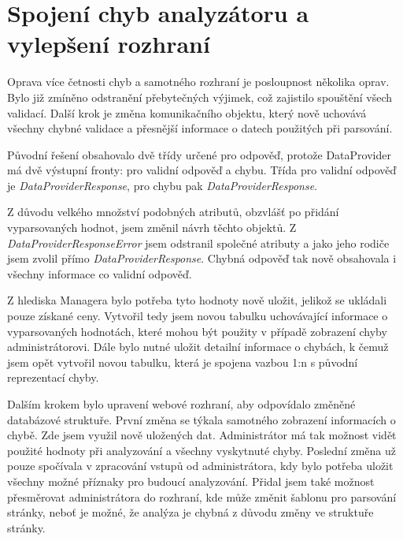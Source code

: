 \documentclass[thesis=B,czech]{FITthesis}[2012/06/26]
\begin{document}
\section{Spojení chyb analyzátoru a vylepšení rozhraní}
Oprava více četnosti chyb a samotného rozhraní je posloupnost několika oprav. 
Bylo již zmíněno odstranění přebytečných výjimek, což zajistilo spouštění všech validací. 
Další krok je změna komunikačního objektu, který nově uchovává všechny chybné validace a přesnější informace
o datech použitých při parsování.
\par
Původní řešení obsahovalo dvě třídy určené pro odpověď, protože DataProvider má dvě výstupní fronty: pro validní odpověď a chybu. 
Třída pro validní odpověď je \textit{DataProviderResponse}, pro chybu pak \textit{DataProviderResponse}.
\par
Z důvodu velkého množství podobných atributů, obzvlášť po přidání vyparsovaných hodnot, jsem změnil návrh těchto objektů.
Z \textit{DataProviderResponseError} jsem odstranil společné atributy a jako jeho rodiče jsem zvolil přímo \textit{DataProviderResponse}.
Chybná odpověď tak nově obsahovala i všechny informace co validní odpověď. 
\par
Z hlediska Managera bylo potřeba tyto hodnoty nově uložit, jelikož se ukládali pouze získané ceny. Vytvořil tedy jsem novou tabulku
uchovávající informace o vyparsovaných hodnotách, které mohou být použity v případě zobrazení chyby administrátorovi.
Dále bylo nutné uložit detailní informace o chybách, k čemuž jsem opět vytvořil novou tabulku, která je spojena vazbou 1:n s původní
reprezentací chyby.
\par
Dalším krokem bylo upravení webové rozhraní, aby odpovídalo změněné databázové struktuře. První změna se týkala samotného zobrazení
informacích o chybě. Zde jsem využil nově uložených dat. Administrátor má tak možnost vidět použité hodnoty při analyzování a všechny
vyskytnuté chyby.
Poslední změna už pouze spočívala v zpracování vstupů od administrátora, kdy bylo potřeba uložit všechny možné příznaky pro 
budoucí analyzování. Přidal jsem také možnost přesměrovat administrátora do rozhraní, kde může změnit šablonu pro parsování
stránky, neboť je možné, že analýza je chybná z důvodu změny ve struktuře stránky.

\newpage
\end{document}

